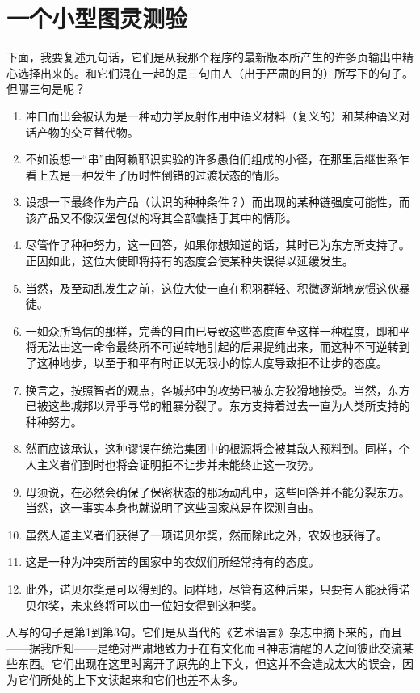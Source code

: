 \section{一个小型图灵测验}

下面，我要复述九句话，它们是从我那个程序的最新版本所产生的许多页输出中精心选择出来的。和它们混在一起的是三句由人（出于严肃的目的）所写下的句子。但哪三句是呢？
\begin{enumerate}
\item 冲口而出会被认为是一种动力学反射作用中语义材料（复义的）和某种语义对话产物的交互替代物。
\item 不如设想一“串”由阿赖耶识实验的许多愚伯们组成的小径，在那里后继世系乍看上去是一种发生了历时性倒错的过渡状态的情形。
\item 设想一下最终作为产品（认识的种种条件？）而出现的某种链强度可能性，而该产品又不像汉堡包似的将其全部囊括于其中的情形。
\item 尽管作了种种努力，这一回答，如果你想知道的话，其时已为东方所支持了。正因如此，这位大使即将持有的态度会使某种失误得以延缓发生。
\item 当然，及至动乱发生之前，这位大使一直在积羽群轻、积微逐渐地宠惯这伙暴徒。
\item 一如众所笃信的那样，完善的自由已导致这些态度直至这样一种程度，即和平将无法由这一命令最终所不可逆转地引起的后果提纯出来，而这种不可逆转到了这种地步，以至于和平有时正以无限小的惊人度导致拒不让步的态度。
\item 换言之，按照智者的观点，各城邦中的攻势已被东方狡猾地接受。当然，东方已被这些城邦以异乎寻常的粗暴分裂了。东方支持着过去一直为人类所支持的种种努力。
\item 然而应该承认，这种谬误在统治集团中的根源将会被其敌人预料到。同样，个人主义者们到时也将会证明拒不让步并未能终止这一攻势。
\item 毋须说，在必然会确保了保密状态的那场动乱中，这些回答并不能分裂东方。当然，这一事实本身也就说明了这些国家总是在探测自由。
\item 虽然人道主义者们获得了一项诺贝尔奖，然而除此之外，农奴也获得了。
\item 这是一种为冲突所苦的国家中的农奴们所经常持有的态度。
\item 此外，诺贝尔奖是可以得到的。同样地，尽管有这种后果，只要有人能获得诺贝尔奖，未来终将可以由一位妇女得到这种奖。
\end{enumerate}

人写的句子是第1到第3句。它们是从当代的《艺术语言》杂志中摘下来的，而且——据我所知——是绝对严肃地致力于在有文化而且神志清醒的人之间彼此交流某些东西。它们出现在这里时离开了原先的上下文，但这并不会造成太大的误会，因为它们所处的上下文读起来和它们也差不太多。

